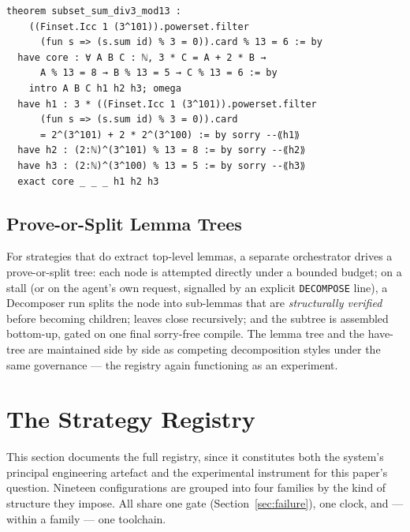 \documentclass[12pt, a4paper]{article}
\begin{document}
\begin{lstlisting}[caption={Planner-skeleton form of the verified proof of problem \#219. Each tagged hole is filled by an isolated sub-agent; the skeleton itself must compile before any hole is attempted.},label={lst:skeleton}]
theorem subset_sum_div3_mod13 :
    ((Finset.Icc 1 (3^101)).powerset.filter
      (fun s => (s.sum id) % 3 = 0)).card % 13 = 6 := by
  have core : ∀ A B C : ℕ, 3 * C = A + 2 * B →
      A % 13 = 8 → B % 13 = 5 → C % 13 = 6 := by
    intro A B C h1 h2 h3; omega
  have h1 : 3 * ((Finset.Icc 1 (3^101)).powerset.filter
      (fun s => (s.sum id) % 3 = 0)).card
      = 2^(3^101) + 2 * 2^(3^100) := by sorry --⟪h1⟫
  have h2 : (2:ℕ)^(3^101) % 13 = 8 := by sorry --⟪h2⟫
  have h3 : (2:ℕ)^(3^100) % 13 = 5 := by sorry --⟪h3⟫
  exact core _ _ _ h1 h2 h3
\end{lstlisting}

\subsection{Prove-or-Split Lemma Trees}

For strategies that do extract top-level lemmas, a separate orchestrator
drives a prove-or-split tree: each node is attempted directly under a
bounded budget; on a stall (or on the agent's own request, signalled by an
explicit \texttt{DECOMPOSE} line), a Decomposer run splits the node into
sub-lemmas that are \emph{structurally verified} before becoming children;
leaves close recursively; and the subtree is assembled bottom-up, gated on
one final sorry-free compile. The lemma tree and the have-tree are
maintained side by side as competing decomposition styles under the same
governance --- the registry again functioning as an experiment.

\section{The Strategy Registry}
\label{sec:registry}

This section documents the full registry, since it constitutes both the
system's principal engineering artefact and the experimental instrument for
this paper's question. Nineteen configurations are grouped into four
families by the kind of structure they impose. All share one gate
(Section~\ref{sec:failure}), one clock, and --- within a family --- one
toolchain.
\end{document}
